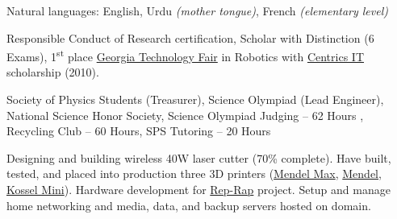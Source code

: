 \documentclass[10pt,a4paper]{article}
\begin{document}
\vspace{0.5em}
\inlineheadsection
  {Natural languages:}
  {English, Urdu \emph{(mother tongue)}, French \emph{(elementary level)}}

\spacedhrule{1.6em}{-0.4em}

  {\href{https://www.citiprogram.org/}{} Responsible Conduct of Research certification,  Scholar with Distinction (6 Exams), 1\textsuperscript{st} place \href{http://www.gatechfair.org/}{Georgia Technology Fair} in Robotics with \href{http://www.centricsit.com/}{Centrics IT} scholarship (2010).}
  
\spacedhrule{0.2em}{-0.4em}
  
	{Society of Physics Students (Treasurer), Science Olympiad (Lead Engineer), National Science Honor Society, Science Olympiad Judging -- 62 Hours , Recycling Club -- 60 Hours, SPS Tutoring -- 20 Hours}

\spacedhrule{0.2em}{-0.4em}

{Designing and building wireless 40W laser cutter (70\% complete). Have built, tested, and placed into production three 3D printers (\href{http://reprap.org/wiki/MendelMax}{Mendel Max}, \href{http://reprap.org/wiki/Mendel}{Mendel}, \href{http://reprap.org/wiki/Kossel}{Kossel Mini}). Hardware development for \href{http://reprap.org/wiki/RepRap}{Rep-Rap} project. Setup and manage home networking and media, data, and backup servers hosted on domain.}
\end{document}
